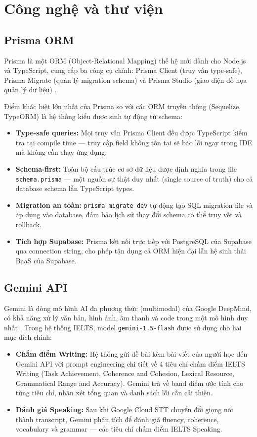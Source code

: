 \documentclass[a4paper,12pt]{extreport}
\begin{document}
\section{Công nghệ và thư viện}

\subsection{Prisma ORM}

Prisma là một ORM (Object-Relational Mapping) thế hệ mới dành cho Node.js và TypeScript, cung cấp ba công cụ chính: Prisma Client (truy vấn type-safe), Prisma Migrate (quản lý migration schema) và Prisma Studio (giao diện đồ họa quản lý dữ liệu) \cite{prisma-docs}.

Điểm khác biệt lớn nhất của Prisma so với các ORM truyền thống (Sequelize, TypeORM) là hệ thống kiểu được sinh tự động từ schema:

\begin{itemize}
    \item \textbf{Type-safe queries:} Mọi truy vấn Prisma Client đều được TypeScript kiểm tra tại compile time — truy cập field không tồn tại sẽ báo lỗi ngay trong IDE mà không cần chạy ứng dụng.
    \item \textbf{Schema-first:} Toàn bộ cấu trúc cơ sở dữ liệu được định nghĩa trong file \texttt{schema.prisma} — một nguồn sự thật duy nhất (single source of truth) cho cả database schema lẫn TypeScript types.
    \item \textbf{Migration an toàn:} \texttt{prisma migrate dev} tự động tạo SQL migration file và áp dụng vào database, đảm bảo lịch sử thay đổi schema có thể truy vết và rollback.
    \item \textbf{Tích hợp Supabase:} Prisma kết nối trực tiếp với PostgreSQL của Supabase qua connection string, cho phép tận dụng cả ORM hiện đại lẫn hệ sinh thái BaaS của Supabase.
\end{itemize}

\subsection{Gemini API}

Gemini là dòng mô hình AI đa phương thức (multimodal) của Google DeepMind, có khả năng xử lý văn bản, hình ảnh, âm thanh và code trong một mô hình duy nhất \cite{gemini-api}. Trong hệ thống IELTS, model \texttt{gemini-1.5-flash} được sử dụng cho hai mục đích chính:

\begin{itemize}
    \item \textbf{Chấm điểm Writing:} Hệ thống gửi đề bài kèm bài viết của người học đến Gemini API với prompt engineering chi tiết về 4 tiêu chí chấm điểm IELTS Writing (Task Achievement, Coherence and Cohesion, Lexical Resource, Grammatical Range and Accuracy). Gemini trả về band điểm ước tính cho từng tiêu chí, nhận xét tổng quan và danh sách lỗi cần cải thiện.
    \item \textbf{Đánh giá Speaking:} Sau khi Google Cloud STT chuyển đổi giọng nói thành transcript, Gemini phân tích để đánh giá fluency, coherence, vocabulary và grammar — các tiêu chí chấm điểm IELTS Speaking.
\end{itemize}
\end{document}
